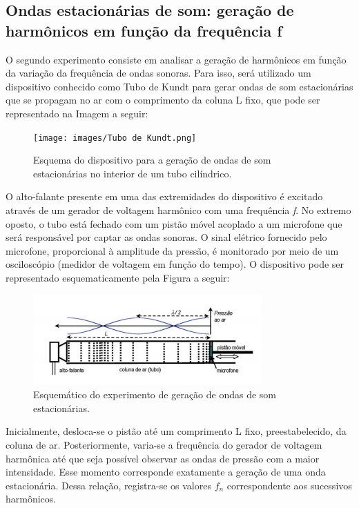 \subsection{Ondas estacionárias de som: geração de harmônicos
em função da frequência f}

O segundo experimento consiste em analisar a geração de harmônicos em função da variação da frequência de ondas sonoras. Para isso, será utilizado um dispositivo conhecido como Tubo de Kundt para gerar ondas de som estacionárias que se propagam no ar com o comprimento da coluna L fixo, que pode ser representado na Imagem a seguir:

\begin{figure}[H]
  \centering
  \texttt{[image: images/Tubo de Kundt.png]}
  \caption{Esquema do dispositivo para a geração de ondas de som estacionárias no interior de um tubo cilíndrico.}
\end{figure}

O alto-falante presente em uma das extremidades do dispositivo é excitado através de um gerador de voltagem harmônico com uma frequência \textit{f}. No extremo oposto, o tubo está fechado com um pistão móvel acoplado a um microfone que será responsável por captar as ondas sonoras. O sinal elétrico fornecido pelo microfone, proporcional à amplitude da pressão, é monitorado por meio de um osciloscópio (medidor de voltagem em função do tempo). O dispositivo pode ser representado esquematicamente pela Figura a seguir:

\begin{figure}[H]
  \centering
  \includegraphics[scale=1.15]{images/esquemático tubo de Kundt.png}
  \caption{Esquemático do experimento de geração de ondas de som estacionárias.}
\end{figure}

Inicialmente, desloca-se o pistão até um comprimento L fixo, preestabelecido, da coluna de ar. Posteriormente, varia-se a frequência do gerador de voltagem harmônica até que seja possível observar as ondas de pressão com a maior intensidade. Esse momento corresponde exatamente a geração de uma onda estacionária. Dessa relação, registra-se os valores \textit{$f_n$} correspondente aos sucessivos harmônicos.

